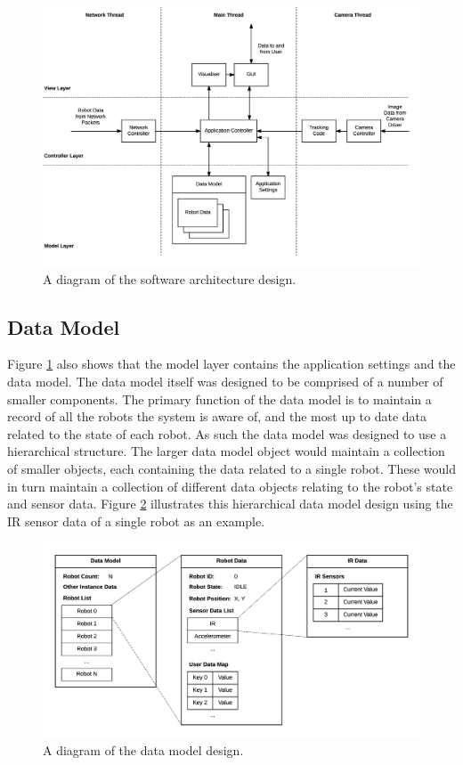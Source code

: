 \begin{figure}
	\centering
	\includegraphics[scale=0.7]{Figures/SoftwareArchitecture.png}
	\decoRule
	\caption[Software Architecture Diagram]{A diagram of the software architecture design.}
	\label{fig:SoftwareArchitecture}
\end{figure}

\subsection{Data Model}
Figure \ref{fig:SoftwareArchitecture} also shows that the model layer contains the application settings and the data model. The data model itself was designed to be comprised of a number of smaller components. The primary function of the data model is to maintain a record of all the robots the system is aware of, and the most up to date data related to the state of each robot. As such the data model was designed to use a hierarchical structure. The larger data model object would maintain a collection of smaller objects, each containing the data related to a single robot. These would in turn maintain a collection of different data objects relating to the robot's state and sensor data. Figure \ref{fig:DataModel} illustrates this hierarchical data model design using the IR sensor data of a single robot as an example.

\begin{figure}
	\centering
	\includegraphics[scale=0.7]{Figures/DataModel.png}
	\decoRule
	\caption[Data Model Diagram]{A diagram of the data model design.}
	\label{fig:DataModel}
\end{figure}


